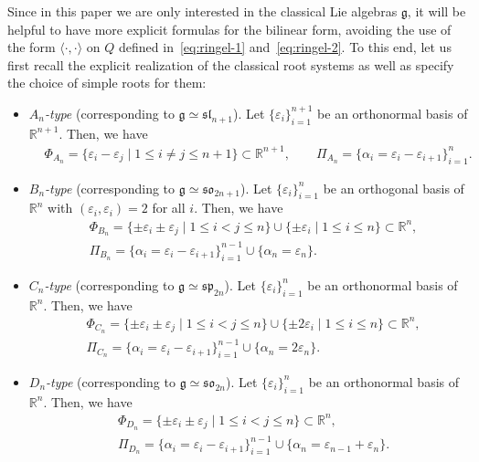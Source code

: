 \documentclass[10pt,a4paper]{amsart}
\numberwithin{equation}{section}
\newcommand{\fg}{\mathfrak{g}}
\newcommand{\ssl}{\mathfrak{sl}}
\newcommand{\sso}{\mathfrak{so}}
\newcommand{\ssp}{\mathfrak{sp}}
\begin{document}
Since in this paper we are only interested in the classical Lie algebras $\fg$, it will be helpful to have more explicit formulas for the bilinear form, avoiding the use of the form $\langle \cdot,\cdot \rangle$ on $Q$ defined in~\eqref{eq:ringel-1} and~\eqref{eq:ringel-2}. To this end, let us first recall the explicit realization of the classical root systems as well as specify the choice of simple roots for them:
\begin{itemize}\itemsep=0pt
\item
\emph{$A_{n}$-type} (corresponding to $\fg\simeq \ssl_{n+1}$).
Let $\{\varepsilon_{i}\}_{i=1}^{n+1}$ be an orthonormal basis of $\mathbb{R}^{n+1}$. Then, we have
\begin{align*}
 & \Phi_{A_{n}} = \{\varepsilon_{i} - \varepsilon_{j}\mid 1\leq i\ne j\leq n+1\}
 \subset \mathbb{R}^{n+1}, \qquad
 \Pi_{A_{n}} = \{\alpha_{i} = \varepsilon_{i} - \varepsilon_{i + 1}\}_{i=1}^{n}.
\end{align*}

\item
\emph{$B_{n}$-type} (corresponding to $\fg\simeq \sso_{2n+1}$).
Let $\{\varepsilon_{i}\}_{i=1}^{n}$ be an orthogonal basis of $\mathbb{R}^{n}$ with $(\varepsilon_{i},\varepsilon_{i})=2$ for all $i$. Then, we have
\begin{align*}
 & \Phi_{B_{n}} = \{\pm \varepsilon_{i} \pm \varepsilon_{j}\mid 1 \le i < j \le n\} \cup
 \{\pm \varepsilon_{i}\mid 1\leq i\leq n\} \subset \mathbb{R}^{n}, \\
 & \Pi_{B_{n}} = \{\alpha_{i} = \varepsilon_{i} - \varepsilon_{i + 1}\}_{i=1}^{n-1}
 \cup \{\alpha_{n} = \varepsilon_{n}\}.
\end{align*}

\item
\emph{$C_{n}$-type} (corresponding to $\fg\simeq \ssp_{2n}$).
Let $\{\varepsilon_{i}\}_{i=1}^{n}$ be an orthonormal basis of $\mathbb{R}^{n}$. Then, we have
\begin{align*}
 & \Phi_{C_{n}} = \{\pm \varepsilon_{i} \pm \varepsilon_{j}\mid 1 \le i < j \le n\}
 \cup \{\pm 2\varepsilon_{i}\mid 1\leq i\leq n\} \subset \mathbb{R}^{n}, \\
 & \Pi_{C_{n}} = \{\alpha_{i} = \varepsilon_{i} - \varepsilon_{i + 1}\}_{i=1}^{n-1}
 \cup \{\alpha_{n} = 2\varepsilon_{n}\}.
\end{align*}

\item
\emph{$D_{n}$-type} (corresponding to $\fg\simeq \sso_{2n}$).
Let $\{\varepsilon_{i}\}_{i=1}^{n}$ be an orthonormal basis of $\mathbb{R}^{n}$. Then, we have
\begin{align}
 & \Phi_{D_{n}} = \{\pm \varepsilon_{i} \pm \varepsilon_{j}\mid 1 \le i < j \le n\}
 \subset \mathbb{R}^{n}, \nonumber\\
 & \Pi_{D_{n}} = \{\alpha_{i} = \varepsilon_{i} - \varepsilon_{i + 1}\}_{i=1}^{n-1}
 \cup \{\alpha_{n} = \varepsilon_{n-1} + \varepsilon_{n}\}.\label{eq:D-system}
\end{align}
\end{itemize}
\end{document}
